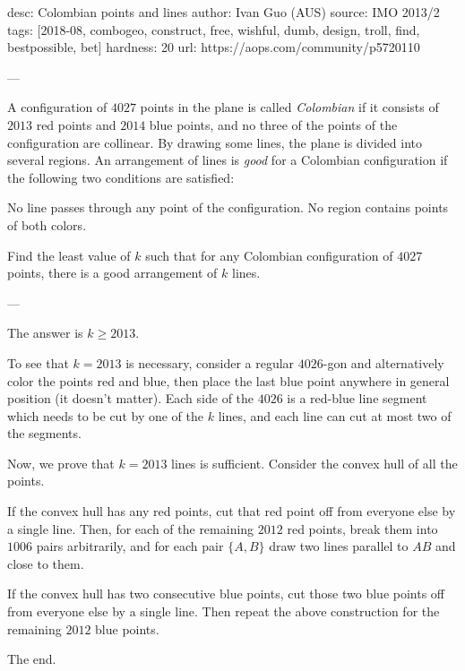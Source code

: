 desc: Colombian points and lines
author: Ivan Guo (AUS)
source: IMO 2013/2
tags: [2018-08, combogeo, construct, free, wishful, dumb, design, troll, find, bestpossible, bet]
hardness: 20
url: https://aops.com/community/p5720110

---

A configuration of $4027$ points in the plane is called
\emph{Colombian} if it consists of $2013$ red points and $2014$ blue points,
and no three of the points of the configuration are collinear.
By drawing some lines, the plane is divided into several regions.
An arrangement of lines is \emph{good} for a Colombian configuration
if the following two conditions are satisfied:
\begin{enumerate}
  \ii[(i)] No line passes through any point of the configuration.
  \ii[(ii)] No region contains points of both colors.
\end{enumerate}
Find the least value of $k$ such that for any Colombian configuration
of $4027$ points, there is a good arrangement of $k$ lines.

---

The answer is $k \ge 2013$.

To see that $k = 2013$ is necessary,
consider a regular $4026$-gon and alternatively color the
points red and blue,
then place the last blue point anywhere
in general position (it doesn't matter).
Each side of the $4026$ is a red-blue line segment
which needs to be cut by one of the $k$ lines,
and each line can cut at most two of the segments.

Now, we prove that $k = 2013$ lines is sufficient.
Consider the convex hull of all the points.
\begin{itemize}
  \ii If the convex hull has any red points,
  cut that red point off from everyone else by a single line.
  Then, for each of the remaining $2012$ red points,
  break them into $1006$ pairs arbitrarily,
  and for each pair $\{A, B\}$ draw two lines
  parallel to $AB$ and close to them.

  \ii If the convex hull has two consecutive blue points,
  cut those two blue points off from everyone else by a single line.
  Then repeat the above construction
  for the remaining $2012$ blue points.
\end{itemize}
The end.
